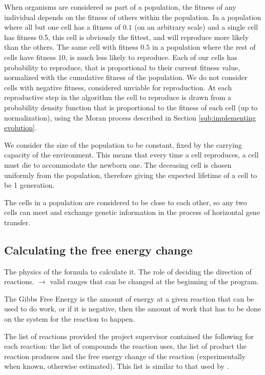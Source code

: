 \documentclass[a4paper,12pt]{article}
\begin{document}
	When organisms are considered as part of a population, the fitness of any individual depends on the fitness of others within the population. In a population where all but one cell has a fitness of $0.1$ (on an arbitrary scale) and a single cell has fitness 0.5, this cell is obviously the fittest, and will reproduce more likely than the others. The same cell with fitness $0.5$ in a population where the rest of cells have fitness $10$, is much less likely to reproduce. Each of our cells has probability to reproduce, that is proportional to their current fitness value, normalized with the cumulative fitness of the population. We do not consider cells with negative fitness, considered unviable for reproduction. At each reproductive step in the algorithm the cell to reproduce is drawn from a probability density function that is proportional to the fitness of each cell (up to normalization), using the Moran process described in Section \ref{sub:implementing evolution}.


	We consider the size of the population to be constant, fixed by the carrying capacity of the environment. This means that every time a cell reproduces, a cell must die to accommodate the newborn one. The deceasing cell is chosen uniformly from the population, therefore giving the expected lifetime of a cell to be 1 generation.

	The cells in a population are considered to be close to each other, so  any two cells can meet and exchange genetic information in the process of horizontal gene transfer.

\subsection{Calculating the free energy change}
\label{sub:The free energy change}
The physics of the formula to calculate it. The role of deciding the direction of reactions.  $\rightarrow$ valid ranges  that can be changed at the beginning of the program.

	The Gibbs Free Energy is the amount of energy at a given reaction that can be used to do work, or if it is negative, then the amount of work that has to be done on the system for the reaction to happen. 


	The list of reactions provided the project supervisor contained the following for each reaction: the list of compounds the reaction uses, the list of product the reaction produces and the free energy change of the reaction (experimentally when known, otherwise estimated). This list is similar to that used by \cite{BartekLower}.
	
\end{document}
